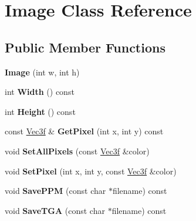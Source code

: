 \hypertarget{classImage}{\section{\-Image \-Class \-Reference}
\label{classImage}
}
\subsection*{\-Public \-Member \-Functions}
\begin{DoxyCompactItemize}
\item 
\hypertarget{classImage_a05c964ca59502cc32c30e8ab89b5e920}{{\bfseries \-Image} (int w, int h)}\label{classImage_a05c964ca59502cc32c30e8ab89b5e920}

\item 
\hypertarget{classImage_a55e9332ab0f27716de2b0765e1134aeb}{int {\bfseries \-Width} () const }\label{classImage_a55e9332ab0f27716de2b0765e1134aeb}

\item 
\hypertarget{classImage_a4ba2103cb0db707dabaea6adbab00be7}{int {\bfseries \-Height} () const }\label{classImage_a4ba2103cb0db707dabaea6adbab00be7}

\item 
\hypertarget{classImage_a5902ab3207a0d6f5b8fe92b6f11cb292}{const \hyperlink{classVec3f}{\-Vec3f} \& {\bfseries \-Get\-Pixel} (int x, int y) const }\label{classImage_a5902ab3207a0d6f5b8fe92b6f11cb292}

\item 
\hypertarget{classImage_a4e91934550b21dd19041ea144e498c3c}{void {\bfseries \-Set\-All\-Pixels} (const \hyperlink{classVec3f}{\-Vec3f} \&color)}\label{classImage_a4e91934550b21dd19041ea144e498c3c}

\item 
\hypertarget{classImage_af2f04f2fe7e6c3aba0401a0c6515963a}{void {\bfseries \-Set\-Pixel} (int x, int y, const \hyperlink{classVec3f}{\-Vec3f} \&color)}\label{classImage_af2f04f2fe7e6c3aba0401a0c6515963a}

\item 
\hypertarget{classImage_a7aeb4943c2f410f9a806e91eb917756d}{void {\bfseries \-Save\-P\-P\-M} (const char $\ast$filename) const }\label{classImage_a7aeb4943c2f410f9a806e91eb917756d}

\item 
\hypertarget{classImage_a12ab68b68cc0f9c6501d2b4a019eb564}{void {\bfseries \-Save\-T\-G\-A} (const char $\ast$filename) const }\label{classImage_a12ab68b68cc0f9c6501d2b4a019eb564}

\end{DoxyCompactItemize}
